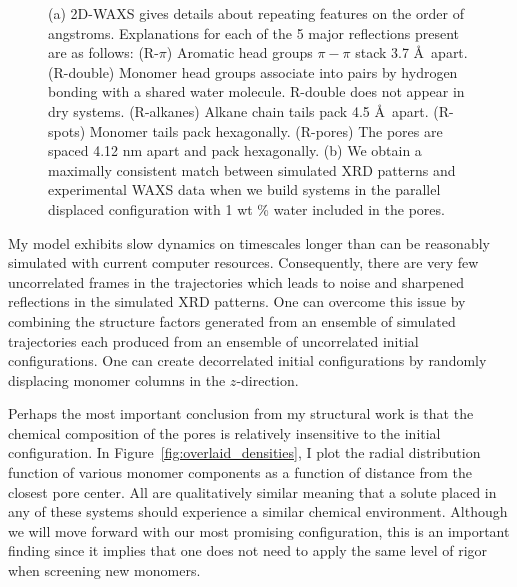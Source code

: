 \documentclass{article}
\begin{document}
\begin{figure}
\begin{subfigure}{0.49\linewidth}
	\end{subfigure}
    \caption{(a) 2D-WAXS gives details about repeating features on the order of
    angstroms. Explanations for each of the 5 major reflections present are
    as follows: (R-$\pi$) Aromatic head groups $\pi-\pi$ stack 3.7 \AA~apart. 
    (R-double) Monomer head groups associate into pairs by hydrogen bonding with
    a shared water molecule. R-double does not appear in dry systems. 
    (R-alkanes) Alkane chain tails pack 4.5 \AA~apart. (R-spots) Monomer tails
    pack hexagonally. (R-pores) The pores are spaced 4.12 nm apart and pack 
    hexagonally. (b) We obtain a maximally consistent match between simulated
    XRD patterns and experimental WAXS data when we build systems in the 
    parallel displaced configuration with 1 wt \% water included in the pores.
    }\label{fig:WAXS_comparison}
    \vspace{-0.75cm}
 \end{figure}
 
  My model exhibits slow dynamics on timescales longer than can be reasonably
  simulated with current computer resources. Consequently, there are very few
  uncorrelated frames in the trajectories which leads to noise and sharpened
  reflections in the simulated XRD patterns. One can overcome this issue by 
  combining the structure factors generated from an ensemble of simulated 
  trajectories each produced from an ensemble of uncorrelated initial 
  configurations. One can create decorrelated initial configurations by 
  randomly displacing monomer columns in the $z$-direction.
 
  Perhaps the most important conclusion from my structural work is that the 
  chemical composition of the pores is relatively insensitive to the initial 
  configuration. In Figure~\ref{fig:overlaid_densities}, I plot the radial 
  distribution function of various monomer components as a function of distance
  from the closest pore center. All are qualitatively similar meaning that a 
  solute placed in any of these systems should experience a similar chemical 
  environment. Although we will move forward with our most promising 
  configuration, this is an important finding since it implies that one does
  not need to apply the same level of rigor when screening new monomers.
  
\end{document}
